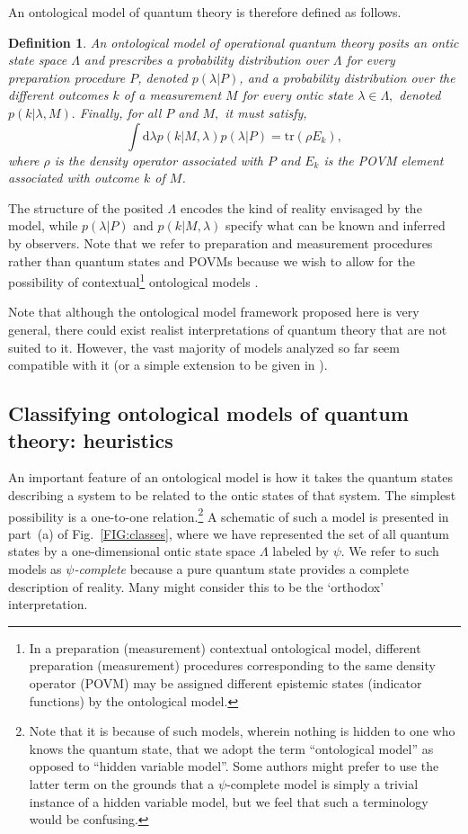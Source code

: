 \documentclass[aps,nofootinbib,12pt]{revtex4}
\newtheorem{definition}[theorem]{Definition}
\begin{document}
An ontological model of quantum theory is therefore defined as
follows.
\begin{definition}
An ontological model of operational quantum theory posits an ontic
state space $\Lambda$ and prescribes a probability distribution over
$\Lambda$ for every preparation procedure $P$, denoted
$p(\lambda|P)$, and a probability distribution over the different
outcomes $k$ of a measurement $M$ for every ontic state
$\lambda\in\Lambda,$ denoted\ $p(k|\lambda,M).$ Finally, for all $P$
and $M,$ it must satisfy,
\begin{equation}
\int\mathrm{d}\lambda{p}(k|M,\lambda)p(\lambda|P)=\mathrm{tr}\left(  \rho
{E}_{k}\right), \label{ont_mod_qm_stats}%
\end{equation}
where $\rho$ is the density operator associated with $P$ and $E_{k}$ is the
POVM element associated with outcome $k$ of $M$.
\end{definition}
The structure of the posited $\Lambda$ encodes the kind of reality
envisaged by the model, while $p(\lambda|P)$ and $p(k|M,\lambda)$
specify what can be known and inferred by observers. Note that we
refer to preparation and measurement procedures rather than quantum
states and POVMs because we wish to allow for the possibility of
contextual\footnote{In a preparation (measurement) contextual
ontological model, different preparation (measurement) procedures
corresponding to the same density operator (POVM) may be assigned
different epistemic states (indicator functions) by the ontological
model.} ontological models \cite{Spekkens_con}.

Note that although the ontological model framework proposed here is
very general, there could exist realist interpretations of quantum
theory that are not suited to it. However, the vast majority of
models analyzed so far seem compatible with it (or a simple
extension to be given in \cite{deficiency}).

\subsection{Classifying ontological models of quantum theory:
heuristics\label{SEC:classes_first}}

An important feature of an ontological model is how it takes the
quantum states describing a system to be related to the ontic states
of that system. The simplest possibility is a one-to-one
relation.\footnote{Note that it is because of such models, wherein
nothing is hidden to one who knows the quantum state, that we adopt
the term ``ontological model'' as opposed to ``hidden variable
model''. Some authors might prefer to use the latter term on the
grounds that a $\psi$-complete model is simply a trivial instance of
a hidden variable model, but we feel that such a terminology would
be confusing.} A schematic of such a model is presented in part~(a)
of Fig.~\ref{FIG:classes}, where we have represented the set of all
quantum states by a one-dimensional ontic state space $\Lambda$
labeled by $\psi.$ We refer to such models as $\psi$\emph{-complete}
because a pure quantum state provides a complete description of
reality. Many might consider this to be the `orthodox'
interpretation.
\end{document}
